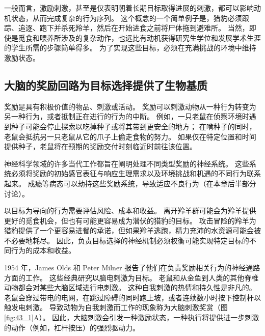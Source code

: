一般而言，激励刺激，甚至是仅表明朝着长期目标取得进展的刺激，都可以影响动机状态，从而完成复杂的行为序列。 这个概念的一个简单例子是，猎豹必须跟踪、追逐、跑下并杀死羚羊，然后在开始进食之前将尸体拖到避难所。 当然，即使是觅食和喂养所涉及的复杂动作，也远比有动机获得研究生学位和发展学术生涯的学生所需的步骤简单得多。 为了实现这些目标，必须在充满挑战的环境中维持激励状态。

\subsection{大脑的奖励回路为目标选择提供了生物基质}
奖励是具有积极价值的物品、刺激或活动。 奖励可以刺激动物从一种行为转变为另一种行为，或者抵制正在进行的行为的中断。 例如，一只老鼠在侦察环境时遇到种子可能会停止探索以吃掉种子或将其带到更安全的地方； 在啃种子的同时，老鼠会抵抗另一只老鼠从它的爪子上偷走食物的努力。 如果仅在特定位置和时间提供种子，老鼠将在预期的奖励交付时刻临近时前往该位置。

神经科学领域的许多当代工作都旨在阐明处理不同类型奖励的神经系统。 这些系统必须将奖励的初始感官表征与响应生理需求以及环境挑战和机遇的不同行为联系起来。 成瘾等病态可以劫持这些奖励系统，导致适应不良行为（在本章后半部分讨论）。

以目标为导向的行为需要评估风险、成本和收益。 离开羚羊群可能会为羚羊提供更好的觅食机会，但也有可能更容易成为潜伏的猎豹的目标。 攻击冒险的羚羊为猎豹提供了一个更容易进餐的承诺，但如果羚羊逃跑，精力充沛的水资源可能会被不必要地耗尽。 因此，负责目标选择的神经机制必须权衡可能实现特定目标的不同行为的成本和收益。

1954 年，James Olds 和 Peter Milner 报告了他们在负责奖励相关行为的神经通路方面的工作。 这些经典研究以脑电刺激为目标。 老鼠和从金鱼到人类的其他脊椎动物都会对某些大脑区域进行电刺激。 这种自我刺激的热情和持久性是非凡的。 老鼠会穿过带电的电网，在跳过障碍的同时跑上坡，或者连续数小时按下控制杆以触发电刺激。 导致动物为自我刺激而工作的现象称为大脑刺激奖赏（图 \ref{fig:43_1}A）。 因此，大脑刺激会引发一种激励状态，一种执行将提供进一步刺激的动作（例如，杠杆按压）的强烈驱动力。

